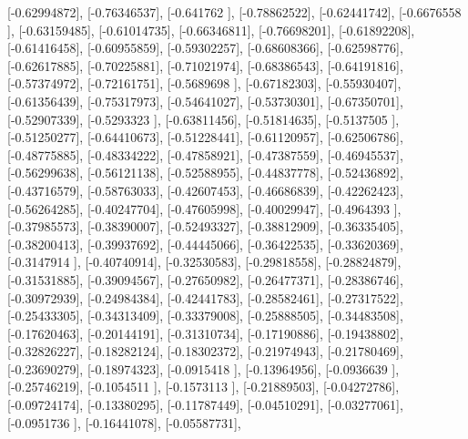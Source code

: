 \documentclass{article}
\begin{document}
       [-0.62994872],
       [-0.76346537],
       [-0.641762  ],
       [-0.78862522],
       [-0.62441742],
       [-0.6676558 ],
       [-0.63159485],
       [-0.61014735],
       [-0.66346811],
       [-0.76698201],
       [-0.61892208],
       [-0.61416458],
       [-0.60955859],
       [-0.59302257],
       [-0.68608366],
       [-0.62598776],
       [-0.62617885],
       [-0.70225881],
       [-0.71021974],
       [-0.68386543],
       [-0.64191816],
       [-0.57374972],
       [-0.72161751],
       [-0.5689698 ],
       [-0.67182303],
       [-0.55930407],
       [-0.61356439],
       [-0.75317973],
       [-0.54641027],
       [-0.53730301],
       [-0.67350701],
       [-0.52907339],
       [-0.5293323 ],
       [-0.63811456],
       [-0.51814635],
       [-0.5137505 ],
       [-0.51250277],
       [-0.64410673],
       [-0.51228441],
       [-0.61120957],
       [-0.62506786],
       [-0.48775885],
       [-0.48334222],
       [-0.47858921],
       [-0.47387559],
       [-0.46945537],
       [-0.56299638],
       [-0.56121138],
       [-0.52588955],
       [-0.44837778],
       [-0.52436892],
       [-0.43716579],
       [-0.58763033],
       [-0.42607453],
       [-0.46686839],
       [-0.42262423],
       [-0.56264285],
       [-0.40247704],
       [-0.47605998],
       [-0.40029947],
       [-0.4964393 ],
       [-0.37985573],
       [-0.38390007],
       [-0.52493327],
       [-0.38812909],
       [-0.36335405],
       [-0.38200413],
       [-0.39937692],
       [-0.44445066],
       [-0.36422535],
       [-0.33620369],
       [-0.3147914 ],
       [-0.40740914],
       [-0.32530583],
       [-0.29818558],
       [-0.28824879],
       [-0.31531885],
       [-0.39094567],
       [-0.27650982],
       [-0.26477371],
       [-0.28386746],
       [-0.30972939],
       [-0.24984384],
       [-0.42441783],
       [-0.28582461],
       [-0.27317522],
       [-0.25433305],
       [-0.34313409],
       [-0.33379008],
       [-0.25888505],
       [-0.34483508],
       [-0.17620463],
       [-0.20144191],
       [-0.31310734],
       [-0.17190886],
       [-0.19438802],
       [-0.32826227],
       [-0.18282124],
       [-0.18302372],
       [-0.21974943],
       [-0.21780469],
       [-0.23690279],
       [-0.18974323],
       [-0.0915418 ],
       [-0.13964956],
       [-0.0936639 ],
       [-0.25746219],
       [-0.1054511 ],
       [-0.1573113 ],
       [-0.21889503],
       [-0.04272786],
       [-0.09724174],
       [-0.13380295],
       [-0.11787449],
       [-0.04510291],
       [-0.03277061],
       [-0.0951736 ],
       [-0.16441078],
       [-0.05587731],
\end{document}
